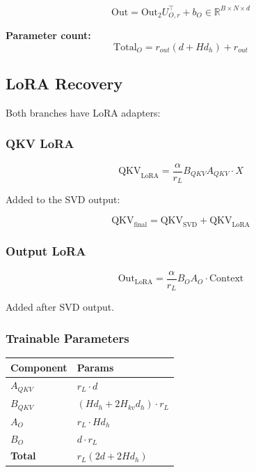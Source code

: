 \begin{equation}
\text{Out} = \text{Out}_2 U_{O, r}^\top + b_O \in \mathbb{R}^{B \times N \times d}
\end{equation}

\textbf{Parameter count:}
\begin{equation}
\text{Total}_O = r_{out} (d + H d_h) + r_{out}
\end{equation}

\subsection{LoRA Recovery}

Both branches have LoRA adapters:

\subsubsection{QKV LoRA}

\begin{equation}
\text{QKV}_\text{LoRA} = \frac{\alpha}{r_L} B_{QKV} A_{QKV} \cdot X
\end{equation}

Added to the SVD output:

\begin{equation}
\text{QKV}_\text{final} = \text{QKV}_\text{SVD} + \text{QKV}_\text{LoRA}
\end{equation}

\subsubsection{Output LoRA}

\begin{equation}
\text{Out}_\text{LoRA} = \frac{\alpha}{r_L} B_O A_O \cdot \text{Context}
\end{equation}

Added after SVD output.

\subsubsection{Trainable Parameters}

\begin{table}[H]
\centering
\small
\begin{tabular}{ll}
\toprule
\textbf{Component} & \textbf{Params} \\
\midrule
$A_{QKV}$ & $r_L \cdot d$ \\
$B_{QKV}$ & $(H d_h + 2 H_{kv} d_h) \cdot r_L$ \\
$A_O$ & $r_L \cdot H d_h$ \\
$B_O$ & $d \cdot r_L$ \\
\textbf{Total} & $r_L (2d + 2 H d_h)$ \\
\bottomrule
\end{tabular}
\end{table}

